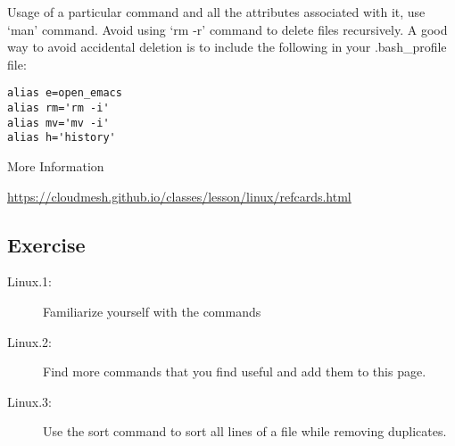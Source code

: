 Usage of a particular command and all the attributes associated with it,
use `man' command. Avoid using `rm -r' command to delete files
recursively. A good way to avoid accidental deletion is to include the
following in your .bash\_profile file:

\begin{verbatim}
alias e=open_emacs
alias rm='rm -i'
alias mv='mv -i' 
alias h='history'
\end{verbatim}

More Information

\url{https://cloudmesh.github.io/classes/lesson/linux/refcards.html}

\subsection{Exercise}\label{exercise}

\begin{description}
\item[Linux.1:]
Familiarize yourself with the commands
\item[Linux.2:]
Find more commands that you find useful and add them to this page.
\item[Linux.3:]
Use the sort command to sort all lines of a file while removing
duplicates.
\end{description}

